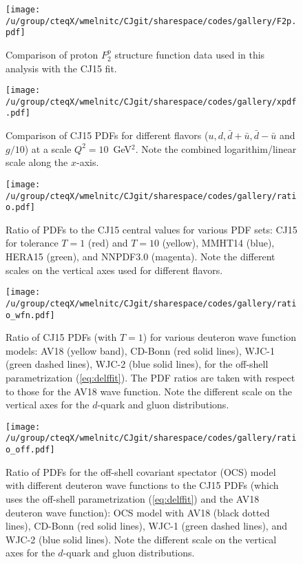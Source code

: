 \documentclass[aps,prd,amsmath,preprint]{revtex4}
\begin{document}
\newpage
\begin{figure}[t]
\texttt{[image: /u/group/cteqX/wmelnitc/CJgit/sharespace/codes/gallery/F2p.pdf]}
\caption{Comparison of proton $F_2^p$ structure function data
	used in this analysis with the CJ15 fit.}
\label{fig:F2p}
\end{figure} 


\begin{figure}[t]
\texttt{[image: /u/group/cteqX/wmelnitc/CJgit/sharespace/codes/gallery/xpdf.pdf]}
\caption{Comparison of CJ15 PDFs for different flavors
	($u, d, \bar d + \bar u, \bar d - \bar u$ and $g/10$)
	at a scale $Q^2=10$~GeV$^2$.
	Note the combined logarithim/linear scale along the $x$-axis.}
\label{fig:pdf}
\end{figure} 


\begin{figure}[t]
\texttt{[image: /u/group/cteqX/wmelnitc/CJgit/sharespace/codes/gallery/ratio.pdf]}
\caption{Ratio of PDFs to the CJ15 central values for various PDF sets:
	CJ15 for tolerance $T=1$ (red) and $T=10$ (yellow),
	MMHT14 \cite{MMHT14} (blue),
	HERA15 \cite{HERA15} (green), and
	NNPDF3.0 \cite{NNPDF3.0} (magenta).
	Note the different scales on the vertical axes used for
	different flavors.}
\label{fig:ratio_other}
\end{figure} 


\begin{figure}[t]
\texttt{[image: /u/group/cteqX/wmelnitc/CJgit/sharespace/codes/gallery/ratio\_wfn.pdf]}
\caption{Ratio of CJ15 PDFs (with $T=1$) for various deuteron
	wave function models:
	AV18 (yellow band),
	CD-Bonn (red solid lines),
	WJC-1 (green dashed lines),
	WJC-2 (blue solid lines),
	for the off-shell parametrization (\ref{eq:delffit}).
	The PDF ratios are taken with respect to those for the
	AV18 wave function.
	Note the different scale on the vertical axes for the
	$d$-quark and gluon distributions.}
\label{fig:ratio_wfn}
\end{figure} 


\begin{figure}[t]
\texttt{[image: /u/group/cteqX/wmelnitc/CJgit/sharespace/codes/gallery/ratio\_off.pdf]}
\caption{Ratio of PDFs for the off-shell covariant spectator (OCS)
	model with different deuteron wave functions to the CJ15 PDFs
	(which uses the off-shell parametrization (\ref{eq:delffit})
	and the AV18 deuteron wave function):
	OCS model with AV18 (black dotted lines),
	CD-Bonn (red solid lines),
	WJC-1 (green dashed lines), and
	WJC-2 (blue solid lines).
	Note the different scale on the vertical axes for the
	$d$-quark and gluon distributions.}
\label{fig:ratio_off}
\end{figure} 
\end{document}
